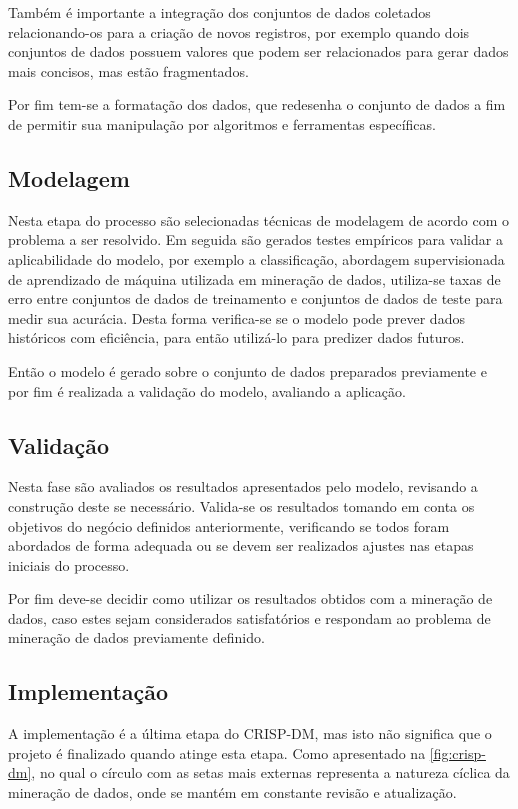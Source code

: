 Também é importante a integração dos conjuntos de dados coletados relacionando-os para a criação de novos registros, por exemplo quando dois conjuntos de dados possuem valores que podem ser relacionados para gerar dados mais concisos, mas estão fragmentados. 

Por fim tem-se a formatação dos dados, que redesenha o conjunto de dados a fim de permitir sua manipulação por algoritmos e ferramentas específicas.

\subsection{Modelagem}

Nesta etapa do processo são selecionadas técnicas de modelagem de acordo com o problema a ser resolvido. 
Em seguida são gerados testes empíricos para validar a aplicabilidade do modelo, por exemplo a classificação, abordagem supervisionada de aprendizado de máquina utilizada em mineração de dados, utiliza-se taxas de erro entre conjuntos de dados de treinamento e conjuntos de dados de teste para medir sua acurácia. Desta forma verifica-se se o modelo pode prever dados históricos com eficiência, para então utilizá-lo para predizer dados futuros. 

Então o modelo é gerado sobre o conjunto de dados preparados previamente e por fim é realizada a validação do modelo, avaliando a aplicação.

\subsection{Validação}

Nesta fase são avaliados os resultados apresentados pelo modelo, revisando a construção deste se necessário. Valida-se os resultados tomando em conta os objetivos do negócio definidos anteriormente, verificando se todos foram abordados de forma adequada ou se devem ser realizados ajustes nas etapas iniciais do processo. 

Por fim deve-se decidir como utilizar os resultados obtidos com a mineração de dados, caso estes sejam considerados satisfatórios e respondam ao problema de mineração de dados previamente definido.

\subsection{Implementação}

A implementação é a última etapa do CRISP-DM, mas isto não significa que o projeto é finalizado quando atinge esta etapa. 
Como apresentado na \autoref{fig:crisp-dm}, no qual o círculo com as setas mais externas representa a natureza cíclica da mineração de dados, onde se mantém em constante revisão e atualização.


